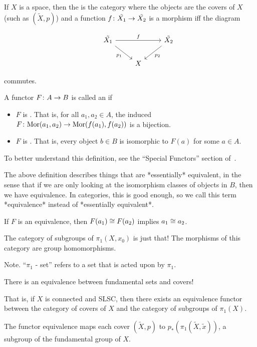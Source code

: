 \documentclass[11pt,leqno,oneside]{amsart}
\numberwithin{thm}{section}
\newcommand{\fund}[1][1]{\pi_{#1}}
\newcommand{\Mor}{\text{Mor}}
\begin{document}
\begin{defn}
  If $X$ is a space, then the  is the category where the objects are the covers of $X$ (such as $(\tilde{X}, p)$) and a function $f \colon \tilde{X_1} \to \tilde{X_2}$ is a morphism iff the diagram

  $$\begin{tikzcd}
    &\tilde{X_1} \arrow[rd, "p_1"'] \arrow[rr, "f"] &&\tilde{X_2} \arrow[ld, "p_2"] \\
    &&X
  \end{tikzcd}$$

  commutes.
\end{defn}
\begin{defn}
  A functor $F \colon A \to B$ is called an  if
  \begin{itemize}
    \item $F$ is .  That is, for all $a_1, a_2 \in A$, the induced $F\from \Mor(a_1, a_2) \to \Mor(f(a_1), f(a_2))$ is a bijection.
    \item $F$ is .  That is, every object $b \in B$ is isomorphic to $F(a)$ for some $a \in A$.
  \end{itemize}
\end{defn}
\begin{rmk}
  To better understand this definition, see the ``Special Functors'' section of~\cite{functors}.

  The above definition describes things that are *essentially* equivalent, in the sense that if we are only looking at the isomorphism classes of objects in $B$, then we have equivalence.  In categories, this is good enough, so we call this term *equivalence* instead of *essentially equivalent*.
\end{rmk}
\begin{rmk}
  If $F$ is an equivalence, then $F(a_1) \mathrel{\cong} F(a_2)$ implies $a_1 \mathrel{\cong} a_2$.
\end{rmk}

\begin{defn}
  The {category of subgroups of $\fund(X, x_0)$} is just that!  The morphisms of this category are group homomorphisms.
\end{defn}

Note.  ``$\fund$ - set'' refers to a set that is acted upon by $\fund$.

\begin{thm}
  There is an equivalence between fundamental sets and covers!

  That is, if $X$ is connected and SLSC, then there exists an equivalence functor between the category of covers of $X$ and the category of subgroups of $\fund(X)$.

  The functor equivalence maps each cover $(\tilde{X}, p)$ to $p_*(\fund(\tilde{X}, \tilde{x}))$, a subgroup of the fundamental group of $X$.
\end{thm}
\end{document}
